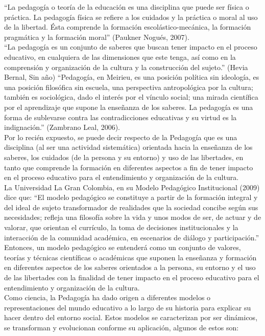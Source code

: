 \documentclass[12pt]{article} %
\begin{document}
“La pedagogía o teoría de la educación es una disciplina que puede ser física o práctica. La pedagogía física se refiere a los cuidados y la práctica o moral al uso de la libertad. Ésta comprende la formación escolástico-mecánica, la formación pragmática y la formación moral” (Paukner Nogués, 2007).\\
“La pedagogía es un conjunto de saberes que buscan tener impacto en el proceso educativo, en cualquiera de las dimensiones que este tenga, así como en la comprensión y organización de la cultura y la construcción del sujeto.” (Hevia Bernal, Sin año)
“Pedagogía, en Meirieu, es una posición política sin ideología, es una posición filosófica sin escuela, una perspectiva antropológica por la cultura; también es sociológica, dado el interés por el vínculo social; una mirada científica por el aprendizaje que supone la enseñanza de los saberes. La pedagogía es una forma de sublevarse contra las contradicciones educativas y su virtud es la indignación.” (Zambrano Leal, 2006).\\
Por lo recién expuesto, se puede decir respecto de la Pedagogía que es una disciplina (al ser una actividad sistemática) orientada hacia la enseñanza de los saberes, los cuidados (de la persona y su entorno) y uso de las libertades, en tanto que comprende la formación en diferentes aspectos a fin de tener impacto en el proceso educativo para el entendimiento y organización de la cultura.\\
La Universidad La Gran Colombia, en su Modelo Pedagógico Institucional (2009) dice que:
“El modelo pedagógico se constituye a partir de la formación integral y del ideal de sujeto transformador de realidades que la sociedad concibe según sus necesidades; refleja una filosofía sobre la vida y unos modos de ser, de actuar y de valorar, que orientan el currículo, la toma de decisiones institucionales y la interacción de la comunidad académica, en escenarios de diálogo y participación.”\\
Entonces, un modelo pedagógico se entenderá como un conjunto de valores, teorías y técnicas científicas o académicas que suponen la enseñanza y formación en diferentes aspectos de los saberes orientados a la persona, su entorno y el uso de las libertades con la finalidad de tener impacto en el proceso educativo para el entendimiento y organización de la cultura.\\
Como ciencia, la Pedagogía ha dado origen a diferentes modelos o representaciones del mundo educativo a lo largo de su historia para explicar su hacer dentro del entorno social. Estos modelos se caracterizan por ser dinámicos, se transforman y evolucionan conforme su aplicación, algunos de estos son:
\end{document}
